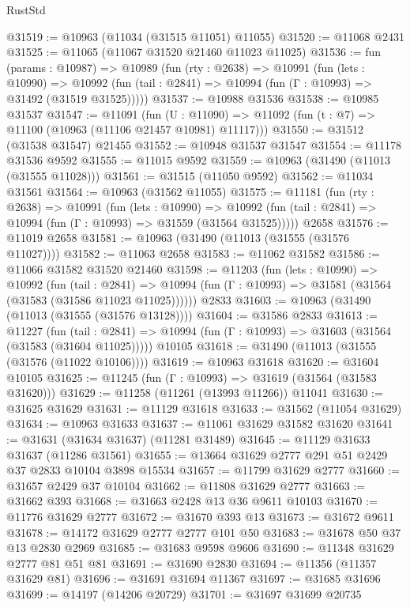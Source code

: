 \begin{lexlean}{RustStd}
\begin{coremodule}
@31519 := @10963 (@11034 (@31515 @11051) @11055)
@31520 := @11068 @2431
@31525 := @11065 (@11067 @31520 @21460 @11023 @11025)
@31536 := fun (params : @10987) =>
  @10989
    (fun (rty : @2638) =>
    @10991
      (fun (lets : @10990) =>
      @10992 (fun (tail : @2841) => @10994 (fun (Γ : @10993) => @31492 (@31519 @31525)))))
@31537 := @10988 @31536
@31538 := @10985 @31537
@31547 := @11091
    (fun (U : @11090) => @11092 (fun (t : @7) => @11100 (@10963 (@11106 @21457 @10981) @11117)))
@31550 := @31512 (@31538 @31547) @21455
@31552 := @10948 @31537 @31547
@31554 := @11178 @31536 @9592
@31555 := @11015 @9592
@31559 := @10963 (@31490 (@11013 (@31555 @11028)))
@31561 := @31515 (@11050 @9592)
@31562 := @11034 @31561
@31564 := @10963 (@31562 @11055)
@31575 := @11181
    (fun (rty : @2638) =>
    @10991
      (fun (lets : @10990) =>
      @10992 (fun (tail : @2841) => @10994 (fun (Γ : @10993) => @31559 (@31564 @31525)))))
    @2658
@31576 := @11019 @2658
@31581 := @10963 (@31490 (@11013 (@31555 (@31576 @11027))))
@31582 := @11063 @2658
@31583 := @11062 @31582
@31586 := @11066 @31582 @31520 @21460
@31598 := @11203
    (fun (lets : @10990) =>
    @10992
      (fun (tail : @2841) =>
      @10994 (fun (Γ : @10993) => @31581 (@31564 (@31583 (@31586 @11023 @11025))))))
    @2833
@31603 := @10963 (@31490 (@11013 (@31555 (@31576 @13128))))
@31604 := @31586 @2833
@31613 := @11227
    (fun (tail : @2841) => @10994 (fun (Γ : @10993) => @31603 (@31564 (@31583 (@31604 @11025)))))
    @10105
@31618 := @31490 (@11013 (@31555 (@31576 (@11022 @10106))))
@31619 := @10963 @31618
@31620 := @31604 @10105
@31625 := @11245 (fun (Γ : @10993) => @31619 (@31564 (@31583 @31620)))
@31629 := @11258 (@11261 (@13993 @11266)) @11041
@31630 := @31625 @31629
@31631 := @11129 @31618
@31633 := @31562 (@11054 @31629)
@31634 := @10963 @31633
@31637 := @11061 @31629 @31582 @31620
@31641 := @31631 (@31634 @31637) (@11281 @31489)
@31645 := @11129 @31633 @31637 (@11286 @31561)
@31655 := @13664 @31629 @2777 @291 @51 @2429 @37 @2833 @10104 @3898 @15534
@31657 := @11799 @31629 @2777
@31660 := @31657 @2429 @37 @10104
@31662 := @11808 @31629 @2777
@31663 := @31662 @393
@31668 := @31663 @2428 @13 @36 @9611 @10103
@31670 := @11776 @31629 @2777
@31672 := @31670 @393 @13
@31673 := @31672 @9611
@31678 := @14172 @31629 @2777 @2777 @101 @50
@31683 := @31678 @50 @37 @13 @2830 @2969
@31685 := @31683 @9598 @9606
@31690 := @11348 @31629 @2777 @81 @51 @81
@31691 := @31690 @2830
@31694 := @11356 (@11357 @31629 @81)
@31696 := @31691 @31694 @11367
@31697 := @31685 @31696
@31699 := @14197 (@14206 @20729)
@31701 := @31697 @31699 @20735

\end{coremodule}
\end{lexlean}
